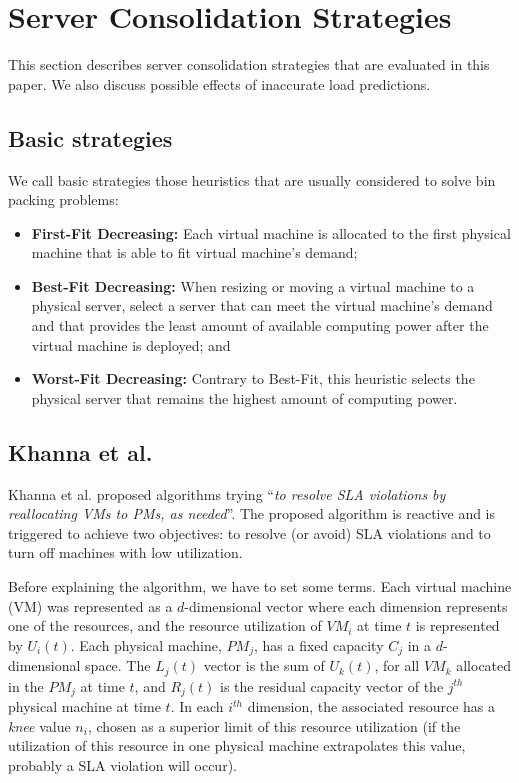 \section{Server Consolidation Strategies}
\label{sec:server_consolidation_strategies}

This section describes server consolidation strategies that are evaluated in this paper. We also discuss possible effects of inaccurate load predictions.

\subsection{Basic strategies}

We call basic strategies those heuristics that are usually considered to solve bin packing problems:

\begin{itemize}
	\item \textbf{First-Fit Decreasing:} Each virtual machine is allocated to the first physical machine that is able to fit virtual machine’s demand;
	\item \textbf{Best-Fit Decreasing:} When resizing or moving a virtual machine to a physical server, select a server that can meet the virtual machine’s demand and that provides the least amount of available computing power after the virtual machine is deployed; and
	\item \textbf{Worst-Fit Decreasing:} Contrary to Best-Fit, this heuristic selects the physical server that remains the highest amount of computing power.
\end{itemize}


\subsection{Khanna et al.~\cite{khanna2006application}}

Khanna et al. proposed algorithms trying ``\emph{to resolve SLA violations by reallocating VMs to PMs, as needed}''.
The proposed algorithm is reactive and is triggered to achieve two objectives: to resolve (or avoid) SLA violations and to turn off machines with low utilization.

Before explaining the algorithm, we have to set some terms.
Each virtual machine (VM) was represented as a $d$-dimensional vector where each dimension represents one of the resources, and the resource utilization of $VM_i$ at time $t$ is represented by $U_i(t)$.
Each physical machine, $PM_j$, has a fixed capacity $C_j$ in a $d$-dimensional space. The $L_j(t)$ vector is the sum of $U_k(t)$, for all $VM_k$ allocated in the $PM_j$ at time $t$, and $R_j(t)$ is the residual capacity vector of the $j^{th}$ physical machine at time $t$. 
In each $i^{th}$ dimension, the associated resource has a \emph{knee} value $n_i$, chosen as a superior limit of this resource utilization (if the utilization of this resource in one physical machine extrapolates this value, probably a SLA violation will occur).

